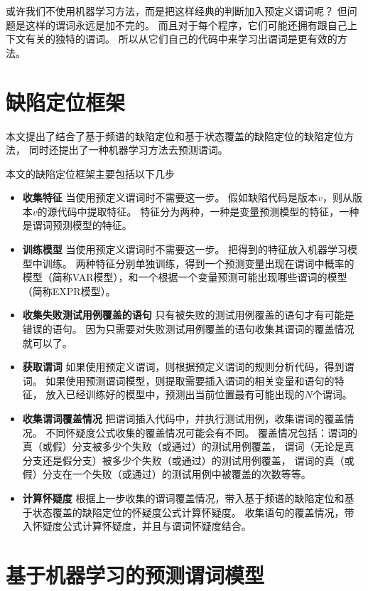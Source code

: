 或许我们不使用机器学习方法，而是把这样经典的判断加入预定义谓词呢？
但问题是这样的谓词永远是加不完的。
而且对于每个程序，它们可能还拥有跟自己上下文有关的独特的谓词。
所以从它们自己的代码中来学习出谓词是更有效的方法。

\section{缺陷定位框架}
\label{sec:fl_frame}

本文提出了结合了基于频谱的缺陷定位和基于状态覆盖的缺陷定位的缺陷定位方法，
同时还提出了一种机器学习方法去预测谓词。

本文的缺陷定位框架主要包括以下几步
\begin{itemize}
\item \textbf{收集特征} 
当使用预定义谓词时不需要这一步。
假如缺陷代码是版本$v$，则从版本$v$的源代码中提取特征。
特征分为两种，一种是变量预测模型的特征，一种是谓词预测模型的特征。
\item \textbf{训练模型}
当使用预定义谓词时不需要这一步。
把得到的特征放入机器学习模型中训练。
两种特征分别单独训练，得到一个预测变量出现在谓词中概率的模型（简称VAR模型），和一个根据一个变量预测可能出现哪些谓词的模型（简称EXPR模型）。
\item \textbf{收集失败测试用例覆盖的语句}
只有被失败的测试用例覆盖的语句才有可能是错误的语句。
因为只需要对失败测试用例覆盖的语句收集其谓词的覆盖情况就可以了。
\item \textbf{获取谓词}
如果使用预定义谓词，则根据预定义谓词的规则分析代码，得到谓词。
如果使用预测谓词模型，则提取需要插入谓词的相关变量和语句的特征，
放入已经训练好的模型中，预测出当前位置最有可能出现的$N$个谓词。
\item \textbf{收集谓词覆盖情况}
把谓词插入代码中，并执行测试用例，收集谓词的覆盖情况。
不同怀疑度公式收集的覆盖情况可能会有不同。
覆盖情况包括：谓词的真（或假）分支被多少个失败（或通过）的测试用例覆盖，
谓词（无论是真分支还是假分支）被多少个失败（或通过）的测试用例覆盖，
谓词的真（或假）分支在一个失败（或通过）的测试用例中被覆盖的次数等等。
\item \textbf{计算怀疑度}
根据上一步收集的谓词覆盖情况，带入基于频谱的缺陷定位和基于状态覆盖的缺陷定位的怀疑度公式计算怀疑度。
收集语句的覆盖情况，带入怀疑度公式计算怀疑度，并且与谓词怀疑度结合。
\end{itemize}

\section{基于机器学习的预测谓词模型}


